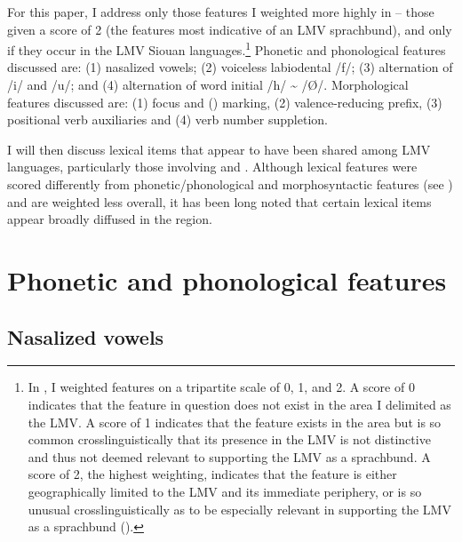 \documentclass[output=paper]{LSP/langsci}
\begin{document}
For this paper, I address only those features I weighted more highly in \citet{Kaufman2014} -- those given a score of 2 (the features most indicative of an LMV sprachbund), and only if they occur in the LMV Siouan languages.\footnote{In \citet{Kaufman2014}, I weighted features on a tripartite scale of 0, 1, and 2. A score of 0 indicates that the feature in question does not exist in the area I delimited as the LMV. A score of 1 indicates that the feature exists in the area but is so common crosslinguistically that its presence in the LMV is not distinctive and thus not deemed relevant to supporting the LMV as a sprachbund. A score of 2, the highest weighting, indicates that the feature is either geographically limited to the LMV and its immediate periphery, or is so unusual crosslinguistically as to be especially relevant in supporting the LMV as a sprachbund (\citealt{Kaufman2014}).} Phonetic and phonological features discussed are: (1) nasalized vowels; (2) voiceless labiodental  /f/; (3) alternation of /i/ and /u/; and (4) alternation of word initial /h/ \textasciitilde{} /Ø/. Morphological features discussed are: (1) focus and  () marking, (2) valence-reducing prefix, (3) positional verb auxiliaries and (4) verb number suppletion. 

I will then discuss lexical items that appear to have been shared among LMV languages, particularly those involving  and . Although lexical features were scored differently from phonetic/phonological and morphosyntactic features (see \citealt{Kaufman2014}) and are weighted less overall, it has been long noted that certain lexical items appear broadly diffused in the region. 

\section{Phonetic and phonological features}

\subsection{Nasalized vowels}
\end{document}
